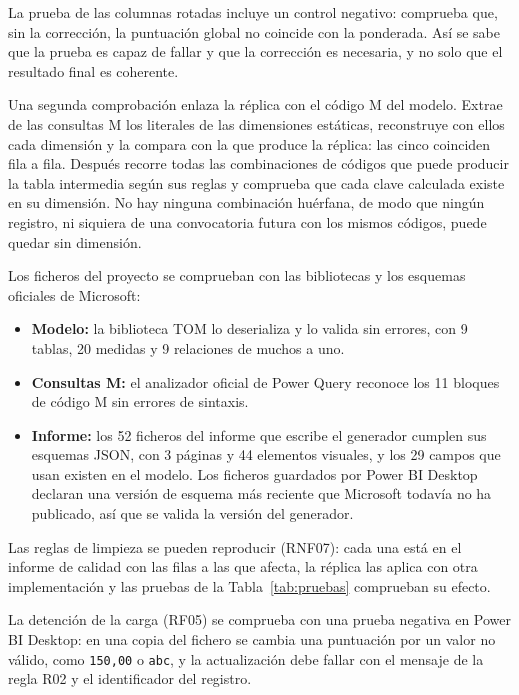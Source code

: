 \documentclass[12pt, a4paper, oneside]{report}
\begin{document}
La prueba de las columnas rotadas incluye un control negativo: comprueba que, sin la corrección, la puntuación global no coincide con la ponderada. Así se sabe que la prueba es capaz de fallar y que la corrección es necesaria, y no solo que el resultado final es coherente.

Una segunda comprobación enlaza la réplica con el código M del modelo. Extrae de las consultas M los literales de las dimensiones estáticas, reconstruye con ellos cada dimensión y la compara con la que produce la réplica: las cinco coinciden fila a fila. Después recorre todas las combinaciones de códigos que puede producir la tabla intermedia según sus reglas y comprueba que cada clave calculada existe en su dimensión. No hay ninguna combinación huérfana, de modo que ningún registro, ni siquiera de una convocatoria futura con los mismos códigos, puede quedar sin dimensión.

Los ficheros del proyecto se comprueban con las bibliotecas y los esquemas oficiales de Microsoft:
\begin{itemize}
    \item \textbf{Modelo:} la biblioteca TOM lo deserializa y lo valida sin errores, con 9 tablas, 20 medidas y 9 relaciones de muchos a uno.
    \item \textbf{Consultas M:} el analizador oficial de Power Query reconoce los 11 bloques de código M sin errores de sintaxis.
    \item \textbf{Informe:} los 52 ficheros del informe que escribe el generador cumplen sus esquemas JSON, con 3 páginas y 44 elementos visuales, y los 29 campos que usan existen en el modelo. Los ficheros guardados por Power BI Desktop declaran una versión de esquema más reciente que Microsoft todavía no ha publicado, así que se valida la versión del generador.
\end{itemize}

Las reglas de limpieza se pueden reproducir (RNF07): cada una está en el informe de calidad con las filas a las que afecta, la réplica las aplica con otra implementación y las pruebas de la Tabla~\ref{tab:pruebas} comprueban su efecto.

La detención de la carga (RF05) se comprueba con una prueba negativa en Power BI Desktop: en una copia del fichero se cambia una puntuación por un valor no válido, como \texttt{150,00} o \texttt{abc}, y la actualización debe fallar con el mensaje de la regla R02 y el identificador del registro.
\end{document}

